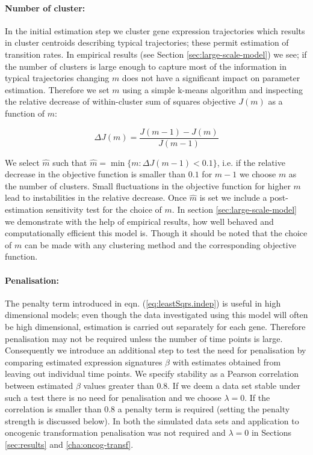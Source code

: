 \paragraph{Number of cluster:}
\label{sec:number-cluster}

In the initial estimation step we cluster gene expression trajectories which results in cluster centroids describing typical trajectories; these permit estimation of transition rates. In empirical results (see Section \ref{sec:large-scale-model}) we see; if the number of clusters is large enough to capture most of the information in typical trajectories changing $m$ does not have a significant impact on parameter estimation. Therefore we set $m$ using a simple k-means algorithm and inspecting the relative decrease of within-cluster sum of squares objective $J(m)$ as a function of $m$:

\[
\Delta J(m) = \frac{J(m-1) - J(m)}{J(m - 1)}
\]

We select $\hat{m}$  such that $\hat{m} = \min \lbrace m : \Delta J(m-1) < 0.1 \rbrace$, i.e. if the relative decrease in the objective function is smaller than $0.1$ for $m-1$ we choose $m$ as the number of clusters. Small fluctuations in the objective function for higher $m$ lead to instabilities in the relative decrease. Once $\hat{m}$ is set we include a post-estimation sensitivity test for the choice of $m$. In section \ref{sec:large-scale-model} we demonstrate with the help of empirical results, how well behaved and computationally efficient this model is. Though it should be noted that the choice of $m$ can be made with any clustering method and the corresponding objective function.

\paragraph{Penalisation:}
\label{sec:penalization}

The penalty term introduced in eqn. (\ref{eq:leastSqrs.indep}) is useful in high dimensional models; even though the data investigated using this model will often be high dimensional, estimation is carried out separately for each gene. Therefore penalisation may not be required unless the number of time points is large. Consequently we introduce an additional step to test the need for penalisation by comparing estimated expression signatures $\beta$ with estimates obtained from leaving out individual time points. We specify stability as a Pearson correlation between estimated $\beta$ values  greater than $0.8$. If we deem a data set stable under such a test there is no need for penalisation and we choose $\lambda=0$. If the correlation is smaller than $0.8$ a penalty term is required (setting the penalty strength is discussed below). In both the simulated data sets and application to oncogenic transformation penalisation was not required and $\lambda=0$ in Sections \ref{sec:results} and \ref{cha:oncog-transf}. 

